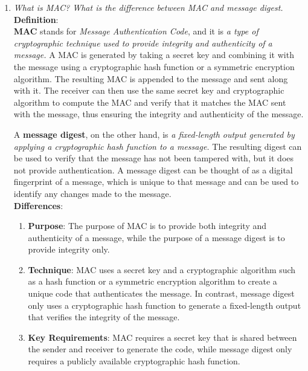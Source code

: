 \documentclass[openany]{book}
\begin{document}
\begin{enumerate}
    \item \textit{What is MAC? What is the difference between MAC and message digest.} \\

          \textbf{\textbf{Definition}}: \\

          \textbf{MAC} stands for \textit{Message Authentication Code}, and it is \textit{a type of cryptographic technique used to provide integrity and authenticity of a message.} A MAC is generated by taking a secret key and combining it with the message using a cryptographic hash function or a symmetric encryption algorithm. The resulting MAC is appended to the message and sent along with it. The receiver can then use the same secret key and cryptographic algorithm to compute the MAC and verify that it matches the MAC sent with the message, thus ensuring the integrity and authenticity of the message.

          A \textbf{message digest}, on the other hand, is \textit{a fixed-length output generated by applying a cryptographic hash function to a message.} The resulting digest can be used to verify that the message has not been tampered with, but it does not provide authentication. A message digest can be thought of as a digital fingerprint of a message, which is unique to that message and can be used to identify any changes made to the message.\\


          \textbf{Differences}:\\

          \begin{enumerate}
              \item \textbf{Purpose}: The purpose of MAC is to provide both integrity and authenticity of a message, while the purpose of a message digest is to provide integrity only.

              \item \textbf{Technique}: MAC uses a secret key and a cryptographic algorithm such as a hash function or a symmetric encryption algorithm to create a unique code that authenticates the message. In contrast, message digest only uses a cryptographic hash function to generate a fixed-length output that verifies the integrity of the message.

              \item \textbf{Key Requirements}: MAC requires a secret key that is shared between the sender and receiver to generate the code, while message digest only requires a publicly available cryptographic hash function.


\end{enumerate}
\end{enumerate}
\end{document}

